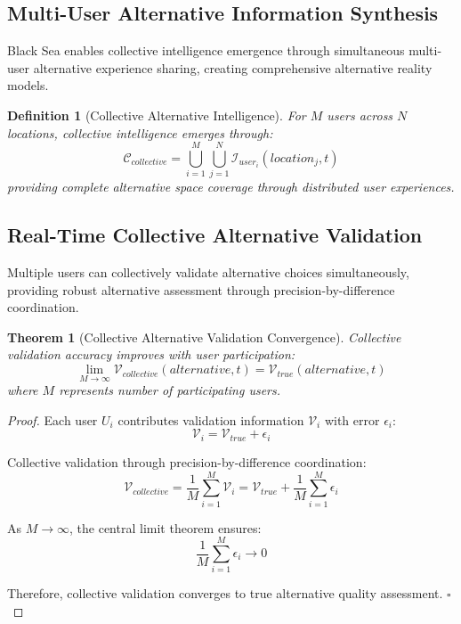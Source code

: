 \documentclass[12pt,a4paper]{article}
\newtheorem{theorem}{Theorem}
\newtheorem{definition}{Definition}
\begin{document}
\subsection{Multi-User Alternative Information Synthesis}

Black Sea enables collective intelligence emergence through simultaneous multi-user alternative experience sharing, creating comprehensive alternative reality models.

\begin{definition}[Collective Alternative Intelligence]
For $M$ users across $N$ locations, collective intelligence emerges through:
\begin{equation}
\mathcal{C}_{collective} = \bigcup_{i=1}^M \bigcup_{j=1}^N \mathcal{I}_{user_i}(location_j, t)
\end{equation}
providing complete alternative space coverage through distributed user experiences.
\end{definition}

\subsection{Real-Time Collective Alternative Validation}

Multiple users can collectively validate alternative choices simultaneously, providing robust alternative assessment through precision-by-difference coordination.

\begin{theorem}[Collective Alternative Validation Convergence]
Collective validation accuracy improves with user participation:
\begin{equation}
\lim_{M \rightarrow \infty} \mathcal{V}_{collective}(alternative, t) = \mathcal{V}_{true}(alternative, t)
\end{equation}
where $M$ represents number of participating users.
\end{theorem}

\begin{proof}
Each user $U_i$ contributes validation information $\mathcal{V}_i$ with error $\epsilon_i$:
\begin{equation}
\mathcal{V}_i = \mathcal{V}_{true} + \epsilon_i
\end{equation}

Collective validation through precision-by-difference coordination:
\begin{equation}
\mathcal{V}_{collective} = \frac{1}{M}\sum_{i=1}^M \mathcal{V}_i = \mathcal{V}_{true} + \frac{1}{M}\sum_{i=1}^M \epsilon_i
\end{equation}

As $M \rightarrow \infty$, the central limit theorem ensures:
\begin{equation}
\frac{1}{M}\sum_{i=1}^M \epsilon_i \rightarrow 0
\end{equation}

Therefore, collective validation converges to true alternative quality assessment. $\square$
\end{proof}
\end{document}
